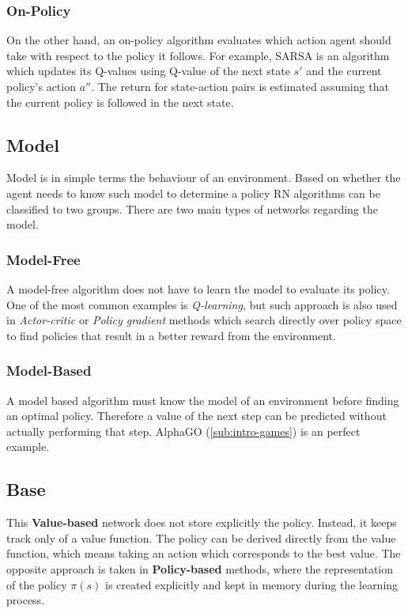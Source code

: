 \subsubsection*{On-Policy}
\label{sub2:on-policy}

On the other hand, an on-policy algorithm evaluates which action agent should take with respect to the policy it follows. For example, SARSA is an algorithm which updates its Q-values using Q-value of the next state $s'$ and the current policy's action $a''$. The return for state-action pairs is estimated assuming that the current policy is followed in the next state.

\subsection{Model}
\label{sub:model}

Model is in simple terms the behaviour of an environment. Based on whether the agent needs to know such model to determine a policy RN algorithms can be classified to two groups. There are two main types of networks regarding the model.

\subsubsection*{Model-Free}
\label{sub2:model-free}

A model-free algorithm does not have to learn the model to evaluate its policy. One of the most common examples is \emph{Q-learning}, but such approach is also used in \emph{Actor-critic} or \emph{Policy gradient} methods which search directly over policy space to find policies that result in a better reward from the environment.

\subsubsection*{Model-Based}
\label{sub2:model-based}

A model based algorithm must know the model of an environment before finding an optimal policy. Therefore a value of the next step can be predicted without actually performing that step. \mbox{AlphaGO} (\ref{sub:intro-games}) is an perfect example.

\subsection{Base}
\label{sub:base}

This \textbf{Value-based} network does not store explicitly the policy. Instead, it keeps track only of a value function. The policy can be derived directly from the value function, which means taking an action which corresponds to the best value.
The opposite approach is taken in \textbf{Policy-based} methods, where the representation of the policy $\pi(s)$ is created explicitly and kept in memory during the learning process. 

